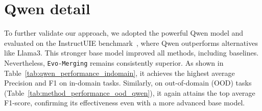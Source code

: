 \section{Qwen detail}
\label{sec:Qwen detail}
To further validate our approach, we adopted the powerful Qwen model and evaluated on the InstructUIE benchmark~\cite{wang2023instructuiemultitaskinstructiontuning}, where Qwen outperforms alternatives like Llama3. This stronger base model improved all methods, including baselines.
Nevertheless, \texttt{Evo-Merging} remains consistently superior. As shown in Table~\ref{tab:qwen_performance_indomain}, it achieves the highest average Precision and F1 on in-domain tasks. Similarly, on out-of-domain (OOD) tasks (Table~\ref{tab:method_performance_ood_qwen}), it again attains the top average F1-score, confirming its effectiveness even with a more advanced base model.




